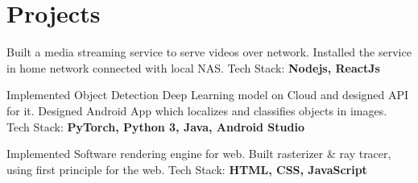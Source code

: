 \section{Projects}
  \resumeSubHeadingListStart
      {
      Built a media streaming service to serve videos over network. Installed the service in home network connected with local NAS. \hfill Tech Stack: \textbf{Nodejs, ReactJs}
      }
      
      {
        Implemented Object Detection Deep Learning model on Cloud and designed API for it. Designed Android App which localizes and classifies objects in
images. \newline Tech Stack: \textbf{PyTorch, Python 3, Java, Android Studio}
      }     
      
      {
      Implemented Software rendering engine for web. Built rasterizer \& ray tracer, using first principle for the web. \hfill Tech Stack: \textbf{HTML, CSS, JavaScript}
      }
  \resumeSubHeadingListEnd